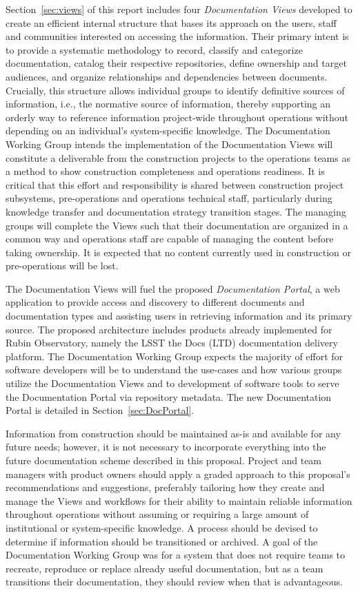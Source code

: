 Section~\ref{sec:views} of this report includes four \emph{Documentation Views} developed to create an efficient internal structure that bases its approach on the users, staff and communities interested on accessing the information.
Their primary intent is to provide a systematic methodology to record, classify and categorize documentation, catalog their respective repositories, define ownership and target audiences, and organize relationships and dependencies between documents.
Crucially, this structure allows individual groups to identify definitive sources of information, i.e., the normative source of information, thereby supporting an orderly way to reference information project-wide throughout operations without depending on an individual's system-specific knowledge.
The Documentation Working Group intends the implementation of the Documentation Views will constitute a deliverable from the construction projects to the operations teams as a method to show construction completeness and operations readiness.
It is critical that this effort and responsibility is shared between construction project subsystems, pre-operations and operations technical staff, particularly during knowledge transfer and documentation strategy transition stages.
The managing groups will complete the Views such that their documentation are organized in a common way and operations staff are capable of managing the content before taking ownership.
It is expected that no content currently used in construction or pre-operations will be lost.

The Documentation Views will fuel the proposed \emph{Documentation Portal}, a web application to provide access and discovery to different documents and documentation types and assisting users in retrieving information and its primary source.
The proposed architecture includes products already implemented for Rubin Observatory, namely the LSST the Docs (LTD) documentation delivery platform.
The Documentation Working Group expects the majority of effort for software developers will be to understand the use-cases and how various groups utilize the Documentation Views and to development of software tools to serve the Documentation Portal via repository metadata.
The new Documentation Portal is detailed in Section~\ref{sec:DocPortal}.

Information from construction should be maintained as-is and available for any future needs; however, it is not necessary to incorporate everything into the future documentation scheme described in this proposal.
Project and team managers with product owners should apply a graded approach to this proposal's recommendations and suggestions, preferably tailoring how they create and manage the Views and workflows for their ability to maintain reliable information throughout operations without assuming or requiring a large amount of institutional or system-specific knowledge. 
A process should be devised to determine if information should be transitioned or archived.
A goal of the Documentation Working Group was for a system that does not require teams to recreate, reproduce or replace already useful documentation, but as a team transitions their documentation, they should review when that is advantageous.

